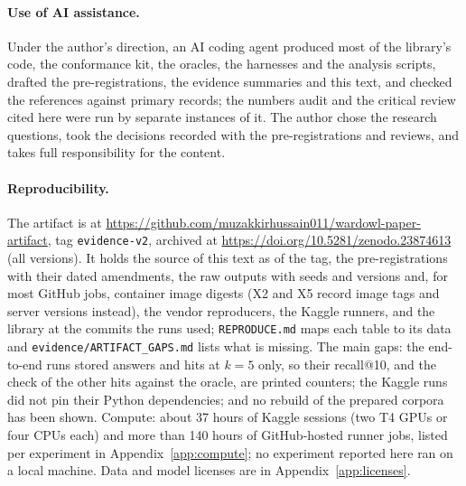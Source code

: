 \paragraph{Use of AI assistance.}\label{sec:limits-ai}
Under the author's direction, an AI coding agent produced most of the library's code, the conformance kit, the oracles, the harnesses and the analysis
scripts, drafted the pre-registrations, the evidence summaries and this text, and checked the references against primary records; the numbers audit and the
critical review cited here were run by separate instances of it. The author chose the research questions, took the decisions recorded with the
pre-registrations and reviews, and takes full responsibility for the content.

\paragraph{Reproducibility.}\label{sec:limits-repro}
The artifact is at \url{https://github.com/muzakkirhussain011/wardowl-paper-artifact}, tag \texttt{evidence-v2}, archived at \url{https://doi.org/10.5281/zenodo.23874613} (all versions). It holds the source of this text as of the tag, the
pre-registrations with their dated amendments, the raw outputs with seeds and versions and, for most GitHub jobs, container image digests (X2 and X5 record image tags and server versions instead), the vendor reproducers, the Kaggle runners, and the library at the commits the runs used; \texttt{REPRODUCE.md} maps each table to its data and \texttt{evidence/ARTIFACT\_GAPS.md} lists what is missing. The main gaps: the end-to-end runs stored answers and hits at $k = 5$ only, so their recall@10, and the check of the other hits against the oracle, are printed counters; the Kaggle runs did not pin their Python dependencies; and no rebuild of the prepared corpora has been shown. Compute: about 37 hours of Kaggle sessions (two T4 GPUs or four CPUs each) and more than 140 hours of GitHub-hosted runner jobs,
listed per experiment in Appendix~\ref{app:compute}; no experiment reported here ran on a local machine. Data and model licenses are in
Appendix~\ref{app:licenses}.

